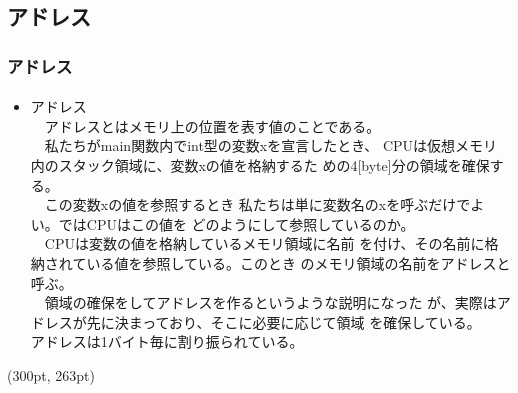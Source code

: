 \documentclass[dvipdfmx]{beamer}
\begin{document}
\subsection{アドレス}
\begin{frame}[t, fragile]
    \frametitle{アドレス}
    \framesubtitle{}
    \begin{itemize}
        \item アドレス\\
            　アドレスとはメモリ上の位置を表す値のことである。\\
             　私たちがmain関数内でint型の変数xを宣言したとき、
             CPUは仮想メモリ内のスタック領域に、変数xの値を格納するた
             めの4[byte]分の領域を確保する。\\
             　この変数xの値を参照するとき
             私たちは単に変数名のxを呼ぶだけでよい。ではCPUはこの値を
             どのようにして参照しているのか。\\
             　CPUは変数の値を格納しているメモリ領域に名前
             を付け、その名前に格納されている値を参照している。このとき
             のメモリ領域の名前をアドレスと呼ぶ。\\
             　領域の確保をしてアドレスを作るというような説明になった
             が、実際はアドレスが先に決まっており、そこに必要に応じて領域
             を確保している。\\
             アドレスは1バイト毎に割り振られている。
    \end{itemize}
    \begin{textblock*}{0.3\linewidth}(300pt, 263pt)
        \space
    \end{textblock*}
\end{frame}
\end{document}
